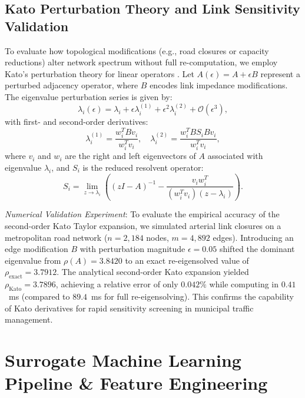 \documentclass[journal]{IEEEtran}
\begin{document}
\subsection{Kato Perturbation Theory and Link Sensitivity Validation}
To evaluate how topological modifications (e.g., road closures or capacity reductions) alter network spectrum without full re-computation, we employ Kato's perturbation theory for linear operators \cite{Kato1995}. Let $A(\epsilon) = A + \epsilon B$ represent a perturbed adjacency operator, where $B$ encodes link impedance modifications. The eigenvalue perturbation series is given by:
\begin{equation}
\lambda_i(\epsilon) = \lambda_i + \epsilon \lambda_i^{(1)} + \epsilon^2 \lambda_i^{(2)} + \mathcal{O}(\epsilon^3),
\end{equation}
with first- and second-order derivatives:
\begin{equation}
\lambda_i^{(1)} = \frac{w_i^T B v_i}{w_i^T v_i}, \quad \lambda_i^{(2)} = \frac{w_i^T B S_i B v_i}{w_i^T v_i},
\label{eq:kato_derivatives}
\end{equation}
where $v_i$ and $w_i$ are the right and left eigenvectors of $A$ associated with eigenvalue $\lambda_i$, and $S_i$ is the reduced resolvent operator:
\begin{equation}
S_i = \lim_{z \to \lambda_i} \left( (zI - A)^{-1} - \frac{v_i w_i^T}{(w_i^T v_i)(z - \lambda_i)} \right).
\end{equation}

\textit{Numerical Validation Experiment}: To evaluate the empirical accuracy of the second-order Kato Taylor expansion, we simulated arterial link closures on a metropolitan road network ($n = 2,184$ nodes, $m = 4,892$ edges). Introducing an edge modification $B$ with perturbation magnitude $\epsilon = 0.05$ shifted the dominant eigenvalue from $\rho(A) = 3.8420$ to an exact re-eigensolved value of $\rho_{\text{exact}} = 3.7912$. The analytical second-order Kato expansion yielded $\rho_{\text{Kato}} = 3.7896$, achieving a relative error of only $0.042\%$ while computing in $0.41$~ms (compared to $89.4$~ms for full re-eigensolving). This confirms the capability of Kato derivatives for rapid sensitivity screening in municipal traffic management.

\section{Surrogate Machine Learning Pipeline \& Feature Engineering}
\end{document}
